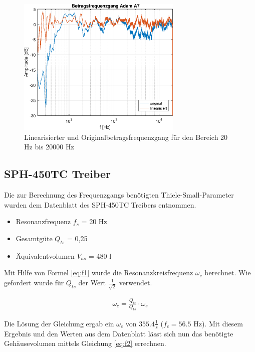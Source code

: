 \begin{figure}[H]
        \centering
        \includegraphics[width=0.7\textwidth]{Figures/frequenzgangA7_lin.eps}
        \caption{Linearisierter und Originalbetragsfrequenzgang für den Bereich 20 Hz bis 20000 Hz}
        \label{fig:frequenzgangA7_lin}
\end{figure}




\subsection{SPH-450TC Treiber}
\label{subsec:c}

Die zur Berechnung des Frequenzgangs benötigten Thiele-Small-Parameter wurden dem Datenblatt \cite{SPH-450TC} des SPH-450TC Treibers entnommen.

\begin{itemize}
  \item Resonanzfrequenz $f_s$ = 20 Hz
  \item Gesamtgüte $Q_{ts}$ = 0,25
  \item Äquivalentvolumen $V_{as}$ = 480 l
\end{itemize}

Mit Hilfe von Formel \ref{eq:f1} wurde die Resonanzkreisfrequenz $\omega_c$ berechnet.
Wie gefordert wurde für $Q_{ts}$ der Wert $\frac{1}{\sqrt{2}}$ verwendet.

\begin{align}
\label{eq:f1}
\omega_c = \frac{Q_{tc}}{Q_{ts}} \cdot \omega_s 
\end{align}

Die Lösung der Gleichung ergab ein $\omega_c$ von $355.4 \frac{1}{s}$ ($f_c = 56.5$ Hz). 
Mit diesem Ergebnis und den Werten aus dem Datenblatt lässt sich nun das benötigte Gehäusevolumen mittels Gleichung \ref{eq:f2} errechnen.

